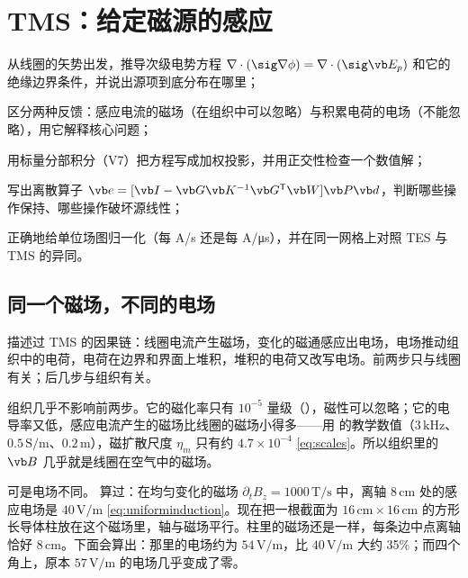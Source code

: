 \chapter{TMS：给定磁源的感应}\label{ch:tms}

\begin{chapterguide}
\begin{guidegoals}
\item 从线圈的矢势出发，推导次级电势方程 $\nabla\cdot(\sig\nabla\phi)=\nabla\cdot(\sig\vb E_p)$ 和它的绝缘边界条件，并说出源项到底分布在哪里；
\item 区分两种反馈：感应电流的磁场（在组织中可以忽略）与积累电荷的电场（不能忽略），用它解释核心问题；
\item 用标量分部积分（V7）把方程写成加权投影，并用正交性检查一个数值解；
\item 写出离散算子 $\vb e=[\vb I-\vb G\vb K^{-1}\vb G^{\mathsf T}\vb W]\vb P\vb d$，判断哪些操作保持、哪些操作破坏源线性；
\item 正确地给单位场图归一化（每 A/s 还是每 A/μs），并在同一网格上对照 TES 与 TMS 的异同。
\end{guidegoals}
\end{chapterguide}

\section{同一个磁场，不同的电场}\label{sec:tms-scene}

 描述过 TMS 的因果链：线圈电流产生磁场，变化的磁通感应出电场，电场推动组织中的电荷，电荷在边界和界面上堆积，堆积的电荷又改写电场。前两步只与线圈有关；后几步与组织有关。

组织几乎不影响前两步。它的磁化率只有 $10^{-5}$ 量级（），磁性可以忽略；它的电导率又低，感应电流产生的磁场比线圈的磁场小得多——用 的教学数值（$3\,\mathrm{kHz}$、$0.5\,\mathrm{S/m}$、$0.2\,\mathrm m$），磁扩散尺度 $\eta_m$ 只有约 $4.7\times10^{-4}$ \eqref{eq:scales}。所以组织里的 $\vb B$ 几乎就是线圈在空气中的磁场。

可是电场不同。 算过：在均匀变化的磁场 $\partial_tB_z=1000\,\mathrm{T/s}$ 中，离轴 $8\,\mathrm{cm}$ 处的感应电场是 $40\,\mathrm{V/m}$ \eqref{eq:uniforminduction}。现在把一根截面为 $16\,\mathrm{cm}\times16\,\mathrm{cm}$ 的方形长导体柱放在这个磁场里，轴与磁场平行。柱里的磁场还是一样，每条边中点离轴恰好 $8\,\mathrm{cm}$。下面会算出：那里的电场约为 $54\,\mathrm{V/m}$，比 $40\,\mathrm{V/m}$ 大约 35\%；而四个角上，原本 $57\,\mathrm{V/m}$ 的电场几乎变成了零。

